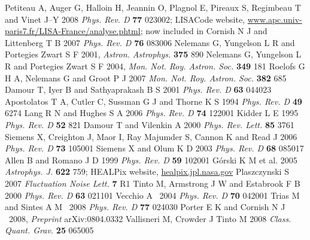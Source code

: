 \documentclass{iopart}
\begin{document}
\begin{thebibliography}{99}
%
 Petiteau A, Auger G, Halloin H, Jeannin O, Plagnol E, Pireaux S, Regimbeau T and Vinet J--Y 2008 \emph{Phys. Rev. D} \textbf{77} 023002; LISACode website, \url{www.apc.univ-paris7.fr/LISA-France/analyse.phtml}; now included in \cite{lisatools}
%
 Cornish N J and Littenberg T B 2007 \textit{Phys. Rev. D} \textbf{76} 083006
%
 Nelemans G, Yungelson L R and Portegies Zwart S F 2001, \textit{Astron. Astrophys.} \textbf{375} 890
%
 Nelemans G, Yungelson L R and Portegies Zwart S F 2004, \emph{Mon. Not. Roy. Astron. Soc.} {\bf 349} 181
%
 Roelofs G H A, Nelemans G and Groot P J 2007
\emph{Mon. Not. Roy. Astron. Soc.} {\bf 382} 685
%
 Damour T, Iyer B and Sathyaprakash B S 2001 \textit{Phys. Rev. D} {\bf 63} 044023
%
 Apostolatos T A, Cutler C, Sussman G J and Thorne K S 1994 \textit{Phys. Rev. D} \textbf{49} 6274
%
 Lang R N and Hughes S A 2006 \textit{Phys. Rev. D} {\bf 74} 122001
%
 Kidder L E 1995 \textit{Phys. Rev. D} {\bf 52} 821
%
 Damour T and Vilenkin A 2000 \textit{Phys. Rev. Lett.} {\bf 85} 3761
%
 Siemens X, Creighton J, Maor I, Ray Majumder S,
Cannon K and Read J 2006 \textit{Phys. Rev. D} {\bf 73} 105001
%
 Siemens X and Olum K D 2003 \textit{Phys. Rev. D} {\bf 68} 085017
%
 Allen B and Romano J D 1999 \textit{Phys. Rev. D} {\bf 59} 102001
%
 G\'orski K M et al. 2005 \textit{Astrophys. J.} {\bf 622} 759; HEALPix website, \url{healpix.jpl.nasa.gov}
%
 Plaszczynski S 2007 \textit{Fluctuation Noise Lett.} {\bf 7} R1
%
 Tinto M, Armstrong J W and Estabrook F B 2000 \textit{Phys. Rev. D} \textbf{63} 021101
%
 Vecchio A \ 2004  \textit{Phys. Rev. D} {\bf 70} 042001 
%
 Trias M and Sintes A M \ 2008 \textit{Phys. Rev. D} {\bf 77} 024030
% 
 Porter E K  and Cornish N J \ 2008, \textit{Preprint} arXiv:0804.0332
%
 Vallisneri M, Crowder J Tinto M 2008 \textit{Class. Quant. Grav.} \textbf{25} 065005
%
\end{thebibliography}
\end{document}
